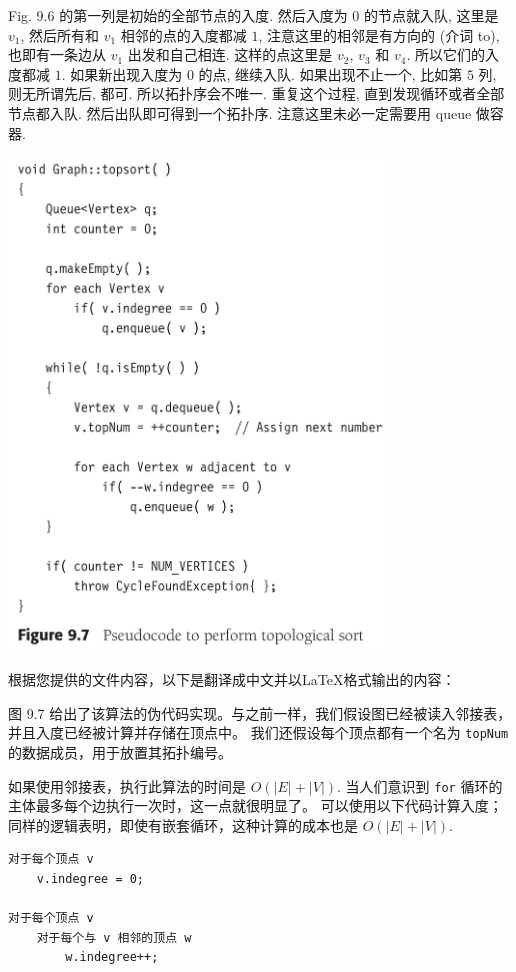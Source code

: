 \documentclass[a4paper]{ctexart}
\theoremstyle{definition}
\theoremstyle{definition}
\begin{document}
Fig. 9.6 的第一列是初始的全部节点的入度. 然后入度为 $0$ 的节点就入队,
这里是 $v_1$, 然后所有和 $v_1$ 相邻的点的入度都减 $1$, 注意这里的相邻是有方向的
(介词 to), 也即有一条边从 $v_1$ 出发和自己相连. 这样的点这里是 $v_2$, $v_3$ 和
$v_4$. 所以它们的入度都减 $1$. 如果新出现入度为 $0$ 的点, 继续入队. 如果出现不止一个,
比如第 $5$ 列, 则无所谓先后, 都可. 所以拓扑序会不唯一. 重复这个过程,
直到发现循环或者全部节点都入队. 然后出队即可得到一个拓扑序.
注意这里未必一定需要用 queue 做容器.
\begin{center}
  \includegraphics[width=0.75\textwidth]{images/FIG9_7.png}
\end{center}

根据您提供的文件内容，以下是翻译成中文并以LaTeX格式输出的内容：

图 9.7 给出了该算法的伪代码实现。与之前一样，我们假设图已经被读入邻接表，并且入度已经被计算并存储在顶点中。
我们还假设每个顶点都有一个名为 \verb|topNum| 的数据成员，用于放置其拓扑编号。

如果使用邻接表，执行此算法的时间是 $O(|E|+|V|)$. 当人们意识到 \verb|for| 循环的主体最多每个边执行一次时，这一点就很明显了。
可以使用以下代码计算入度；同样的逻辑表明，即使有嵌套循环，这种计算的成本也是 $O(|E|+|V|)$.

\begin{verbatim}
对于每个顶点 v
    v.indegree = 0;

对于每个顶点 v
    对于每个与 v 相邻的顶点 w
        w.indegree++;
\end{verbatim}
\end{document}
